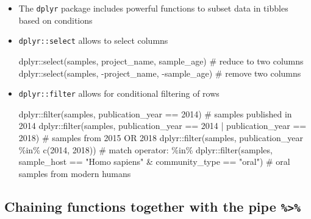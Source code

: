 \documentclass[
  letterpaper,
]{book}
\newenvironment{Shaded}{}{}
\newcommand{\CommentTok}[1]{\textcolor[rgb]{0.42,0.45,0.49}{#1}}
\newcommand{\DecValTok}[1]{\textcolor[rgb]{0.00,0.36,0.77}{#1}}
\newcommand{\FunctionTok}[1]{\textcolor[rgb]{0.44,0.26,0.76}{#1}}
\newcommand{\NormalTok}[1]{\textcolor[rgb]{0.14,0.16,0.18}{#1}}
\newcommand{\SpecialCharTok}[1]{\textcolor[rgb]{0.00,0.36,0.77}{#1}}
\newcommand{\StringTok}[1]{\textcolor[rgb]{0.01,0.18,0.38}{#1}}
\begin{document}
\begin{itemize}
\item
  The \texttt{dplyr} package includes powerful functions to subset data
  in tibbles based on conditions
\item
  \texttt{dplyr::select} allows to select columns

\begin{Shaded}
\begin{Highlighting}[]
\NormalTok{dplyr}\SpecialCharTok{::}\FunctionTok{select}\NormalTok{(samples, project\_name, sample\_age)   }\CommentTok{\# reduce to two columns}
\NormalTok{dplyr}\SpecialCharTok{::}\FunctionTok{select}\NormalTok{(samples, }\SpecialCharTok{{-}}\NormalTok{project\_name, }\SpecialCharTok{{-}}\NormalTok{sample\_age) }\CommentTok{\# remove two columns}
\end{Highlighting}
\end{Shaded}
\item
  \texttt{dplyr::filter} allows for conditional filtering of rows

\begin{Shaded}
\begin{Highlighting}[]
\NormalTok{dplyr}\SpecialCharTok{::}\FunctionTok{filter}\NormalTok{(samples, publication\_year }\SpecialCharTok{==} \DecValTok{2014}\NormalTok{)  }\CommentTok{\# samples published in 2014}
\NormalTok{dplyr}\SpecialCharTok{::}\FunctionTok{filter}\NormalTok{(samples, publication\_year }\SpecialCharTok{==} \DecValTok{2014} \SpecialCharTok{|}
\NormalTok{                    publication\_year }\SpecialCharTok{==} \DecValTok{2018}\NormalTok{)  }\CommentTok{\# samples from 2015 OR 2018}
\NormalTok{dplyr}\SpecialCharTok{::}\FunctionTok{filter}\NormalTok{(samples, publication\_year }\SpecialCharTok{\%in\%} \FunctionTok{c}\NormalTok{(}\DecValTok{2014}\NormalTok{, }\DecValTok{2018}\NormalTok{)) }\CommentTok{\# match operator: \%in\%}
\NormalTok{dplyr}\SpecialCharTok{::}\FunctionTok{filter}\NormalTok{(samples, sample\_host }\SpecialCharTok{==} \StringTok{"Homo sapiens"} \SpecialCharTok{\&}
\NormalTok{                    community\_type }\SpecialCharTok{==} \StringTok{"oral"}\NormalTok{)  }\CommentTok{\# oral samples from modern humans}
\end{Highlighting}
\end{Shaded}
\end{itemize}

\hypertarget{chaining-functions-together-with-the-pipe}{%
\subsection{\texorpdfstring{Chaining functions together with the pipe
\texttt{\%\textgreater{}\%}}{Chaining functions together with the pipe \%\textgreater\%}}\label{chaining-functions-together-with-the-pipe}}
\end{document}
